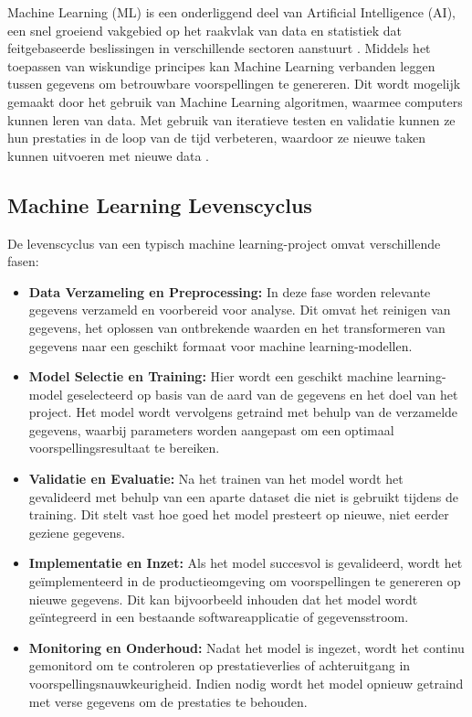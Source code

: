 Machine Learning (ML) is een onderliggend deel van Artificial Intelligence (AI), een snel groeiend vakgebied op het raakvlak van data en statistiek dat feitgebaseerde beslissingen in verschillende sectoren aanstuurt \autocite{Jordan2015}. Middels het toepassen van wiskundige principes kan Machine Learning verbanden leggen tussen gegevens om betrouwbare voorspellingen te genereren. Dit wordt mogelijk gemaakt door het gebruik van Machine Learning algoritmen, waarmee computers kunnen leren van data. Met gebruik van iteratieve testen en validatie kunnen ze hun prestaties in de loop van de tijd verbeteren, waardoor ze nieuwe taken kunnen uitvoeren met nieuwe data \autocite{Shaveta2023}.

\subsection{Machine Learning Levenscyclus}

De levenscyclus van een typisch machine learning-project omvat verschillende fasen:

\begin{itemize}
    \item \textbf{Data Verzameling en Preprocessing:} In deze fase worden relevante gegevens verzameld en voorbereid voor analyse. Dit omvat het reinigen van gegevens, het oplossen van ontbrekende waarden en het transformeren van gegevens naar een geschikt formaat voor machine learning-modellen\autocite{Schlegel2022}.
    \item \textbf{Model Selectie en Training:} Hier wordt een geschikt machine learning-model geselecteerd op basis van de aard van de gegevens en het doel van het project. Het model wordt vervolgens getraind met behulp van de verzamelde gegevens, waarbij parameters worden aangepast om een optimaal voorspellingsresultaat te bereiken\autocite{Schlegel2022}.
    \item \textbf{Validatie en Evaluatie:}  Na het trainen van het model wordt het gevalideerd met behulp van een aparte dataset die niet is gebruikt tijdens de training. Dit stelt vast hoe goed het model presteert op nieuwe, niet eerder geziene gegevens\autocite{Schlegel2022}.
    \item \textbf{Implementatie en Inzet:}  Als het model succesvol is gevalideerd, wordt het geïmplementeerd in de productieomgeving om voorspellingen te genereren op nieuwe gegevens. Dit kan bijvoorbeeld inhouden dat het model wordt geïntegreerd in een bestaande softwareapplicatie of gegevensstroom\autocite{Schlegel2022}.
    \item \textbf{Monitoring en Onderhoud:}  Nadat het model is ingezet, wordt het continu gemonitord om te controleren op prestatieverlies of achteruitgang in voorspellingsnauwkeurigheid. Indien nodig wordt het model opnieuw getraind met verse gegevens om de prestaties te behouden\autocite{Schlegel2022}.
  \end{itemize}

